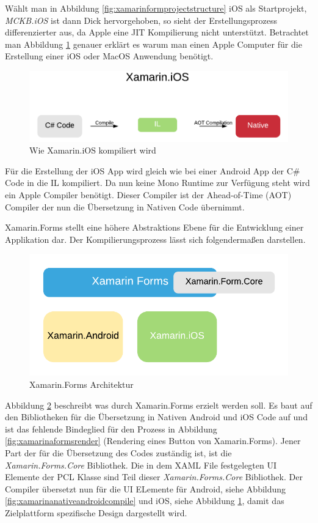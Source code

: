 	Wählt man in Abbildung \ref{fig:xamarinformprojectstructure} iOS als Startprojekt, \textit{MCKB.iOS} ist dann Dick hervorgehoben, so sieht der Erstellungsprozess differenzierter aus, da Apple eine JIT Kompilierung nicht unterstützt. Betrachtet man Abbildung \ref{fig:xamarinanativeioscompile} genauer erklärt es warum man einen Apple Computer für die Erstellung einer iOS oder MacOS Anwendung benötigt.
	\begin{figure}[h!]
		\centering
		\includegraphics[width=1\textwidth]{images/Xamarin-iOS.png}
		\caption{Wie Xamarin.iOS kompiliert wird}
		\label{fig:xamarinanativeioscompile}
	\end{figure}

	Für die Erstellung der iOS App wird gleich wie bei einer Android App der C\# Code in die IL kompiliert. Da nun keine Mono Runtime zur Verfügung steht wird ein Apple Compiler benötigt. Dieser Compiler ist der Ahead-of-Time (AOT) Compiler der nun die Übersetzung in Nativen Code übernimmt.

	Xamarin.Forms stellt eine höhere Abstraktions Ebene für die Entwicklung einer Applikation dar. Der Kompilierungsprozess lässt sich folgendermaßen darstellen.
	\begin{figure}[h!]
		\centering
		\includegraphics[width=1\textwidth]{images/Xamarin-Forms.png}
		\caption{Xamarin.Forms Architektur}
		\label{fig:xamarinformsarchitecture}
	\end{figure}

	Abbildung \ref{fig:xamarinformsarchitecture} beschreibt was durch Xamarin.Forms erzielt werden soll. Es baut auf den Bibliotheken für die Übersetzung in Nativen Android und iOS Code auf und ist das fehlende Bindeglied für den Prozess in Abbildung \ref{fig:xamarinaformsrender} (Rendering eines Button von Xamarin.Forms). Jener Part der für die Übersetzung des Codes zuständig ist, ist die \textit{Xamarin.Forms.Core} Bibliothek. Die in dem XAML File festgelegten UI Elemente der PCL Klasse sind Teil dieser \textit{Xamarin.Forms.Core} Bibliothek. Der Compiler übersetzt nun für die UI ELemente für Android, siehe Abbildung \ref{fig:xamarinanativeandroidcompile} und iOS, siehe Abbildung \ref{fig:xamarinanativeioscompile}, damit das Zielplattform spezifische Design dargestellt wird.
	\newpage

